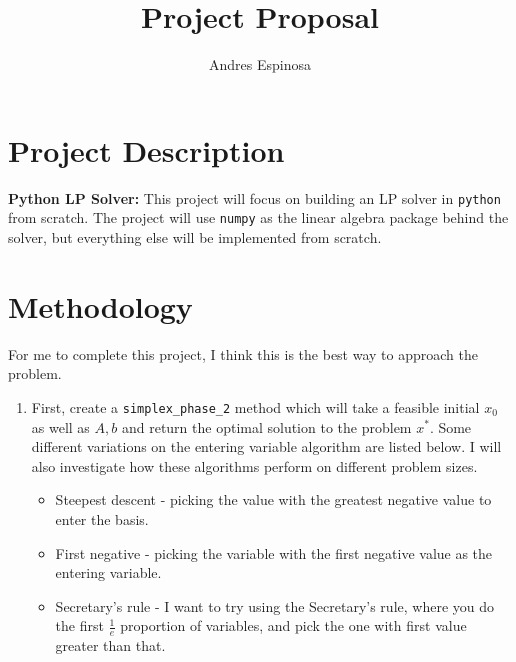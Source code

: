 \documentclass[11pt]{article}
\title{Project Proposal}
\author{Andres Espinosa}
\begin{document}
\maketitle

\section{Project Description}
\textbf{Python LP Solver:}
This project will focus on building an LP solver in \texttt{python} from scratch. 
The project will use \texttt{numpy} as the linear algebra package behind the solver, but everything else will be implemented from scratch.

\section{Methodology}
For me to complete this project, I think this is the best way to approach the problem.
\begin{enumerate}
    \item First, create a \texttt{simplex\_phase\_2} method which will take a feasible initial $x_0$ as well as $A,b$ and return the optimal solution to the problem $x^*$.
          Some different variations on the entering variable algorithm are listed below.
          I will also investigate how these algorithms perform on different problem sizes.
        \begin{itemize}
            \item Steepest descent - picking the value with the greatest negative value to enter the basis.
            \item First negative - picking the variable with the first negative value as the entering variable.
            \item Secretary's rule - I want to try using the Secretary's rule, where you do the first $\frac{1}{e}$ proportion of variables, and pick the one with first value greater than that.
        \end{itemize}
\end{enumerate}
\end{document}
